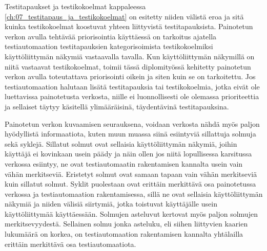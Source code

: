   Testitapaukset ja testikokoelmat kappaleessa \ref{ch:07_testitapaus_ja_testikokoelmat} on esitetty niiden välistä eroa ja sitä kuinka testikokoelmat koostuvat yhteen liittyvistä testitapauksista.
  Painotetun verkon avulla tehtävää priorisointia käyttäessä on tarkoitus ajatella testiautomaation testitapauksien kategorisoimista testikokoelmiksi käyttöliittymän näkymiä vastaavalla tavalla.
  Kun käyttöliittymän näkymillä on niitä vastaavat testikokoelmat, toimii tässä diplomityössä kehitetty painotetun verkon avulla toteutattava priorisointi oikein ja siten kuin se on tarkoitettu.
  Jos testiautomaation halutaan lisätä testitapauksia tai testikokoelmia, jotka eivät ole luettavissa painotetusta verkosta, niille ei luonnollisesti ole olemassa prioriteettia ja sellaiset täytyy käsitellä ylimääräisinä, täydentävinä testitapauksina.

  Painotetun verkon kuvaamisen seurauksena, voidaan verkosta nähdä myös paljon hyödyllistä informaatiota, kuten muun muassa siinä esiintyviä sillattuja solmuja sekä syklejä.
  Sillatut solmut ovat sellaisia käyttöliittymän näkymiä, joihin käyttäjä ei kovinkaan usein päädy ja näin ollen jos niitä lopullisessa karsitussa verkossa esiintyy, ne ovat testiautomaatin rakentamisen kannalta usein vain vähän merkitseviä.
  Eristetyt solmut ovat samaan tapaan vain vähän merkitseviä kuin sillatut solmut.
  Syklit puolestaan ovat erittäin merkittävä osa painotetussa verkossa ja testiautomaation rakentamisessa, sillä ne ovat sellaisia käyttöliittymän näkymiä ja niiden välisiä siirtymiä, jotka toistuvat käyttäjälle usein käyttöliittymää käyttäessään.
  Solmujen asteluvut kertovat myös paljon solmujen merkitsevyydestä.
  Sellainen solmu jonka asteluku, eli siihen liittyvien kaarien lukumäärä on korkea, on testiautomaation rakentamisen kannalta yhtälailla erittäin merkittävä osa testiautomaatiota.
